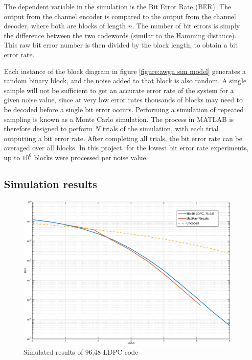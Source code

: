 \documentclass[11pt]{article}
\numberwithin{equation}{subsection}
\begin{document}
The dependent variable in the simulation is the Bit Error Rate (BER). The output from the channel encoder is compared to the output from the channel decoder, where both are blocks of length $n$. The number of bit errors is simply the difference between the two codewords (similar to the Hamming distance). This raw bit error number is then divided by the block length, to obtain a bit error rate.

Each instance of the block diagram in figure \ref{figure:awgn sim model} generates a random binary block, and the noise added to that block is also random. A single sample will not be sufficient to get an accurate error rate of the system for a given noise value, since at very low error rates thousands of blocks may need to be decoded before a single bit error occurs. Performing a simulation of repeated sampling is known as a Monte Carlo simulation. The process in MATLAB is therefore designed to perform $N$ trials of the simulation, with each trial outputting a bit error rate. After completing all trials, the bit error rate can be averaged over all blocks. In this project, for the lowest bit error rate experiments, up to $10^6$ blocks were processed per noise value.

\subsection{Simulation results}
\begin{figure}[h]
\centering
\includegraphics[scale=0.5]{96_48_LDPC}
\caption{Simulated results of 96,48 LDPC code}
\label{figure:96_48_LDPC_graph}
\end{figure}
\end{document}
